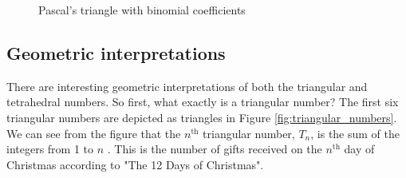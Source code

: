 \documentclass{article}
\theoremstyle{definition}
\begin{document}
\vspace{1.25em}
%
%
\def \nrows {14}                                                 		%
%
%
%
\begin{figure}[H]                                                       %
  \centering                                                            %
   \resizebox{0.55 \textwidth}{!} {                                     %
   }                                                                    %
  \caption{Pascal's triangle with binomial coefficients}
  \label{fig:pascals_triangle_with_binomial_coefficients}
\end{figure}

\smallskip
\subsection{Geometric interpretations}
\label{subsec:geometric_interpretation}
There are interesting geometric interpretations of both the
triangular and tetrahedral numbers. So first, what exactly is a
triangular number?  The first six triangular numbers are depicted
as triangles in Figure \ref{fig:triangular_numbers}.  We can see
from the figure that the $n^{\text{th}}$ triangular number, $T_n$,
is the sum of the integers from 1 to $n$ \cite{wiki:triangle_numbers}.  
This is the number of gifts received on the $n^{\text{th}}$ day of
Christmas according to "The 12 Days of Christmas".
  
\end{document}
